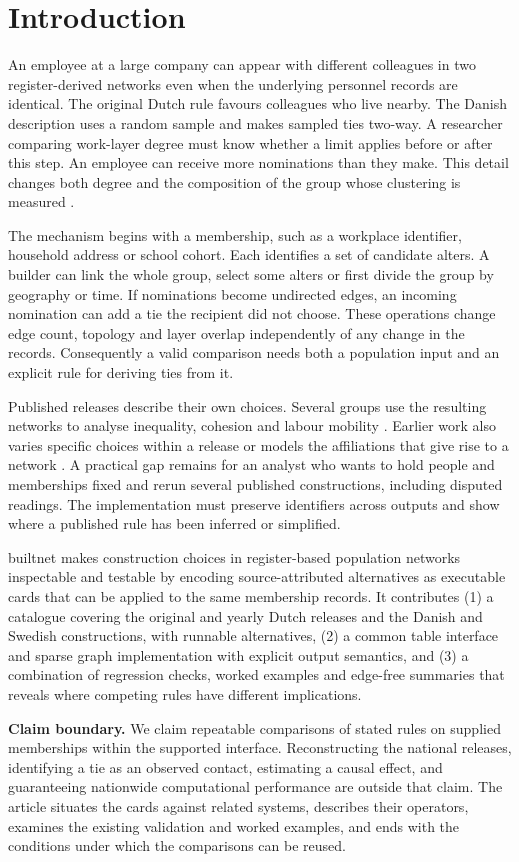 \section{Introduction}\label{sec:intro}

An employee at a large company can appear with different colleagues in two register-derived networks even when the underlying personnel records are identical. The original Dutch rule favours colleagues who live nearby. The Danish description uses a random sample and makes sampled ties two-way. A researcher comparing work-layer degree must know whether a limit applies before or after this step. An employee can receive more nominations than they make. This detail changes both degree and the composition of the group whose clustering is measured \citep{vanderlaan2022,cremers2025}.

The mechanism begins with a membership, such as a workplace identifier, household address or school cohort. Each identifies a set of candidate alters. A builder can link the whole group, select some alters or first divide the group by geography or time. If nominations become undirected edges, an incoming nomination can add a tie the recipient did not choose. These operations change edge count, topology and layer overlap independently of any change in the records. Consequently a valid comparison needs both a population input and an explicit rule for deriving ties from it.

Published releases describe their own choices. Several groups use the resulting networks to analyse inequality, cohesion and labour mobility \citep{kazmina2024,bokanyi2026,lengyel2017}. Earlier work also varies specific choices within a release or models the affiliations that give rise to a network \citep{lengyel2017,hamilton2026}. A practical gap remains for an analyst who wants to hold people and memberships fixed and rerun several published constructions, including disputed readings. The implementation must preserve identifiers across outputs and show where a published rule has been inferred or simplified.

builtnet makes construction choices in register-based population networks inspectable and testable by encoding source-attributed alternatives as executable cards that can be applied to the same membership records. It contributes (1) a catalogue covering the original and yearly Dutch releases and the Danish and Swedish constructions, with runnable alternatives, (2) a common table interface and sparse graph implementation with explicit output semantics, and (3) a combination of regression checks, worked examples and edge-free summaries that reveals where competing rules have different implications.

\textbf{Claim boundary.} We claim repeatable comparisons of stated rules on supplied memberships within the supported interface. Reconstructing the national releases, identifying a tie as an observed contact, estimating a causal effect, and guaranteeing nationwide computational performance are outside that claim. The article situates the cards against related systems, describes their operators, examines the existing validation and worked examples, and ends with the conditions under which the comparisons can be reused.
